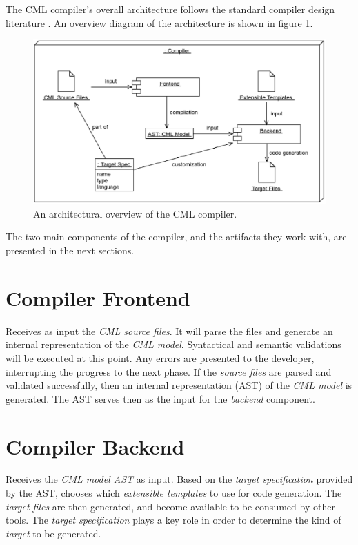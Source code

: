 The CML compiler's overall architecture follows the standard compiler design literature \cite{torben}. An overview diagram of the architecture is shown in figure \ref{fig:overview}.

\begin{figure}
\centering
\includegraphics[width=\textwidth]{compiler/figure-overview}
\caption{An architectural overview of the CML compiler.}
\label{fig:overview}
\end{figure}

The two main components of the compiler,
and the artifacts they work with,
are presented in the next sections.

\section[Frontend]{Compiler Frontend}

Receives as input the \emph{CML source files}.
It will parse the files and generate an internal representation of the \emph{CML model}.
Syntactical and semantic validations will be executed at this point.
Any errors are presented to the developer, interrupting the progress to the next phase.
If the \emph{source files} are parsed and validated successfully, then an internal representation (AST) of the \emph{CML model} is generated.
The AST serves then as the input for the \emph{backend} component.

\section[Backend]{Compiler Backend}

Receives the \emph{CML model AST} as input.
Based on the \emph{target specification} provided by the AST, chooses which \emph{extensible templates} to use for code generation.
The \emph{target files} are then generated, and become available to be consumed by other tools. The \emph{target specification} plays a key role in order to determine the kind of \emph{target} to be generated.